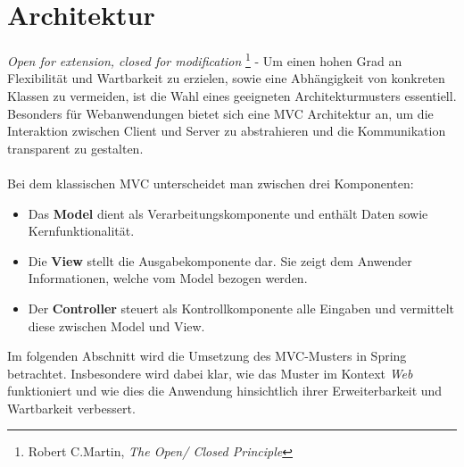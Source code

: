 \section{Architektur}

\textit{Open for extension, closed for modification} \footnote{Robert C.Martin, \textit{The Open/
Closed Principle}} - Um einen hohen Grad an Flexibilität und Wartbarkeit zu erzielen, sowie eine 
Abhängigkeit von konkreten Klassen zu vermeiden, ist die Wahl eines geeigneten Architekturmusters 
essentiell. Besonders für Webanwendungen bietet sich eine \ac{MVC} Architektur an, um die 
Interaktion zwischen Client und Server zu abstrahieren und die Kommunikation transparent zu gestalten.
\\\\
Bei dem klassischen \acs{MVC} unterscheidet man zwischen drei Komponenten:
\begin{itemize}
  \item Das \textbf{Model} dient als Verarbeitungskomponente und enthält Daten sowie Kernfunktionalität.
  \item Die \textbf{View} stellt die Ausgabekomponente dar. Sie zeigt dem Anwender Informationen, welche vom Model bezogen werden.
  \item Der \textbf{Controller} steuert als Kontrollkomponente alle Eingaben und vermittelt diese zwischen Model und View.
\end{itemize}
Im folgenden Abschnitt wird die Umsetzung des \acs{MVC}-Musters in Spring betrachtet. Insbesondere wird 
dabei klar, wie das Muster im Kontext \textit{Web} funktioniert und wie dies die Anwendung hinsichtlich 
ihrer Erweiterbarkeit und Wartbarkeit verbessert. 
